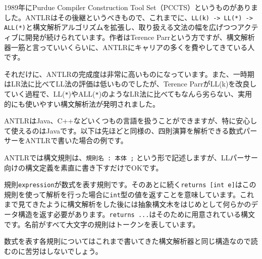 1989年にPurdue Compiler Construction Tool
Set（PCCTS）というものがありました。ANTLRはその後継というべきもので、これまでに、\texttt{LL(k) -> LL(*) -> ALL(*)}と構文解析アルゴリズムを拡張し、取り扱える文法の幅を広げつつアクティブに開発が続けられています。作者はTerence
Parrという方ですが、構文解析器一筋と言っていいくらいに、ANTLRにキャリアの多くを費やしてきている人です。

それだけに、ANTLRの完成度は非常に高いものになっています。また、一時期はLR法に比べてLL法の評価は低いものでしたが、Terence
ParrがLL(k)を改良していく過程で、LL(\texttt{*})やALL(\texttt{*})のようなLR法に比べてもなんら劣らない、実用的にも使いやすい構文解析法が発明されました。

ANTLRはJava、C++などいくつもの言語を扱うことができますが、特に安心して使えるのはJavaです。以下は先ほどと同様の、四則演算を解析できる数式パーサーをANTLRで書いた場合の例です。

ANTLRでは構文規則は、\texttt{規則名\ :\ 本体\ ;}
という形で記述しますが、LLパーサー向けの構文定義を素直に書き下すだけでOKです。


規則\texttt{expression}が数式を表す規則です。そのあとに続く\texttt{returns\ {[}int\ e{]}}はこの規則を使って解析を行った場合に\texttt{int}型の値を返すことを意味しています。これまで見てきたように構文解析をした後には抽象構文木をはじめとして何らかのデータ構造を返す必要があります。\texttt{returns\ ...}はそのために用意されている構文です。名前がすべて大文字の規則はトークンを表しています。

数式を表す各規則についてはこれまで書いてきた構文解析器と同じ構造なので読むのに苦労はしないでしょう。

